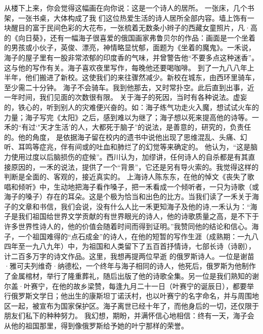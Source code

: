 \documentclass{article}
\begin{document}
从楼下上来，你会觉得这幅画在向你说：这是一个诗人的居所。
一张床，几个书架，一张书桌，大体构成了我
\newpage
们这位热爱生活的诗人居所全部内容。墙上饰有一块醒目的富于民间色彩的大花布，一张梳着无数条小辫子的西藏女童照片，凡·高的《向日葵》，还有一幅海子很喜爱的俄国画家弗鲁贝尔的作品：画面是一个坐着的男孩或小伙子，英俊、漂亮，神情略显忧郁，面题为《坐着的魔鬼》。一禾说，海子的屋子里有一股非常浓郁的印度香的气味，并曾警告他“不要多点这种迷香”。这与他的写作有关。海子喜欢夜里写作，每晚他还要喝咖啡。
到了一九八八年上半年，他们搬进了新校。这使我们的来往骤然减少。新校在城东，由西环里骑车，至少需二十分钟。
海子不会骑车。我到他那去，又时常扑空。此后直到出事，近一年时间，我们见面的次数很有限。
关于海子的死因，当时有各种说法。虚妄的，铁心的，听到别人的灾难便兴奋的。如：海子练气功走火入魔，想试试火车的力量；海子写完《太阳》之后，感到难以为继了；海子想以死来提高他的诗等。一禾的“有过‘"天才生活’的人，大都死于脑子”的说法，是善意的，研究的，负责任的。他的角度，
\newpage
是依据海子留在校内的遗书中说他出现了思维混乱、头痛、幻听、耳鸣等症兆，伴有间或的吐血和肺烂了的幻觉等来确定的。
他认为，“这是脑力使用过度以后脑损伤的症候”。西川认为，加缪讲，任何诗人的自杀都是有其直接原因的，一禾的说法，提供了一个“背景”，它还是另有导火索的。我觉得这样的判断是全面的、客观的，接近真实的。
上海诗人陈东东，在他的悼文《丧失了歌唱和倾听》中，生动地把海子看作嗓子，把一禾看成一个倾听者，一只为诗歌（或海子的嗓子）存在的耳朵。这是个极为恰当和出色的比方。当我们读了一禾关于海子的文章和书信，我们会说，没有什么人比一禾更知海子及他的诗,一禾认为：“海子是我们祖国给世界文学贡献的有世界眼光的诗人，他的诗歌质量之高，是不下于许多世界性诗人的，他的价值会随着时间而得到证明。”我赞同他的结论和信心。海子，一个祖国难得的“点石成金”的诗人，在他的短暂的写作生涯（成熟期：一九八四年至一九八九年）中，为祖国和人类留下了五百首抒情诗，七部长诗（诗剧），计二百多万字的诗文作品。这里，我想再提两位早逝
\newpage
的俄罗斯诗人。一位是谢苗·雅可夫列维奇·纳德松，一个终年与海子相同的诗人，他死后，俄罗斯为他制作了金属棺材，举行了隆重葬礼，随后出版了他的诗歌全集。另一位是我们熟知的谢尔盖·叶赛宁，在他的故乡梁赞，每逢九月二十一日（叶赛宁的诞辰日），都要举行俄罗斯文学日；他出生的康斯坦丁诺沃村，也以叶赛宁的名字命名，并与周围地区一起，被宣布为国家保护区。海子离世已经十年了，而他身后的一切，还仅限于朋友们私下的种种努力。
我幻想，期盼，并满怀信心地相信：终有一天，海子会从他的祖国那里，得到像俄罗斯给予她的叶宁那样的荣誉。
\end{document}
